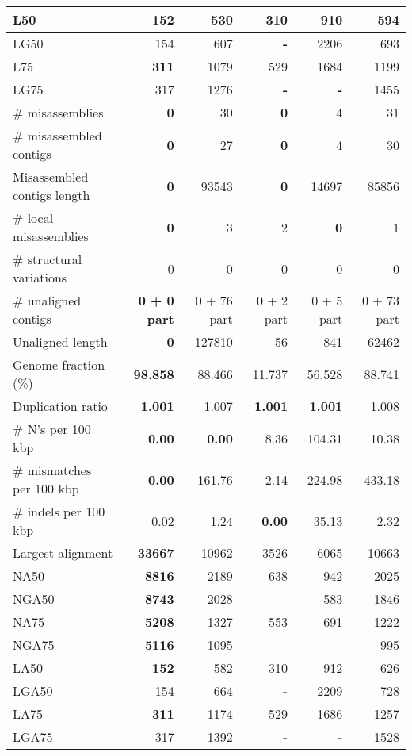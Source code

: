 \documentclass[12pt,a4paper]{article}
\begin{document}
\begin{table}[ht]
\begin{center}
\begin{tabular}{|l*{5}{|r}|}
L50 & {\bf 152} & 530 & 310 & 910 & 594 \\ \hline
LG50 & 154 & 607 & {\bf -} & 2206 & 693 \\ \hline
L75 & {\bf 311} & 1079 & 529 & 1684 & 1199 \\ \hline
LG75 & 317 & 1276 & {\bf -} & {\bf -} & 1455 \\ \hline
\# misassemblies & {\bf 0} & 30 & {\bf 0} & 4 & 31 \\ \hline
\# misassembled contigs & {\bf 0} & 27 & {\bf 0} & 4 & 30 \\ \hline
Misassembled contigs length & {\bf 0} & 93543 & {\bf 0} & 14697 & 85856 \\ \hline
\# local misassemblies & {\bf 0} & 3 & 2 & {\bf 0} & 1 \\ \hline
\# structural variations & 0 & 0 & 0 & 0 & 0 \\ \hline
\# unaligned contigs & {\bf 0 + 0 part} & 0 + 76 part & 0 + 2 part & 0 + 5 part & 0 + 73 part \\ \hline
Unaligned length & {\bf 0} & 127810 & 56 & 841 & 62462 \\ \hline
Genome fraction (\%) & {\bf 98.858} & 88.466 & 11.737 & 56.528 & 88.741 \\ \hline
Duplication ratio & {\bf 1.001} & 1.007 & {\bf 1.001} & {\bf 1.001} & 1.008 \\ \hline
\# N's per 100 kbp & {\bf 0.00} & {\bf 0.00} & 8.36 & 104.31 & 10.38 \\ \hline
\# mismatches per 100 kbp & {\bf 0.00} & 161.76 & 2.14 & 224.98 & 433.18 \\ \hline
\# indels per 100 kbp & 0.02 & 1.24 & {\bf 0.00} & 35.13 & 2.32 \\ \hline
Largest alignment & {\bf 33667} & 10962 & 3526 & 6065 & 10663 \\ \hline
NA50 & {\bf 8816} & 2189 & 638 & 942 & 2025 \\ \hline
NGA50 & {\bf 8743} & 2028 & - & 583 & 1846 \\ \hline
NA75 & {\bf 5208} & 1327 & 553 & 691 & 1222 \\ \hline
NGA75 & {\bf 5116} & 1095 & - & - & 995 \\ \hline
LA50 & {\bf 152} & 582 & 310 & 912 & 626 \\ \hline
LGA50 & 154 & 664 & {\bf -} & 2209 & 728 \\ \hline
LA75 & {\bf 311} & 1174 & 529 & 1686 & 1257 \\ \hline
LGA75 & 317 & 1392 & {\bf -} & {\bf -} & 1528 \\ \hline
\end{tabular}
\end{center}
\end{table}
\end{document}
